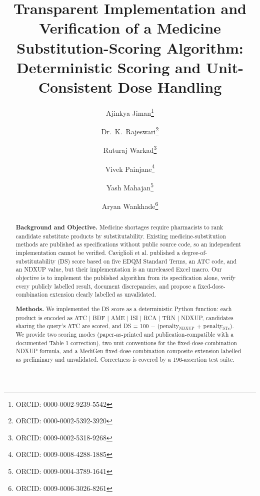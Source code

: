\documentclass[a4paper]{elsarticle}
\begin{document}
\onecolumn

{
\setlength{\parskip}{1pt}
\setlength{\parindent}{0pt}
\begin{frontmatter}

\title{Transparent Implementation and Verification of a Medicine Substitution-Scoring Algorithm:\\Deterministic Scoring and Unit-Consistent Dose Handling}

\author[1]{Ajinkya Jiman\footnote{ORCID: 0000-0002-9239-5542}}
\author[1]{Dr.~K.~Rajeswari\footnote{ORCID: 0000-0002-5392-3920}}
\author[1]{Ruturaj Warkad\footnote{ORCID: 0009-0002-5318-9268}}
\author[1]{Vivek Painjane\footnote{ORCID: 0009-0008-4288-1885}}
\author[1]{Yash Mahajan\footnote{ORCID: 0009-0004-3789-1641}}
\author[1]{Aryan Wankhade\footnote{ORCID: 0009-0006-3026-8261}}



\begin{abstract}
\textbf{Background and Objective.} Medicine shortages require pharmacists to rank candidate substitute products by substitutability. Existing medicine-substitution methods are published as specifications without public source code, so an independent implementation cannot be verified. Caviglioli et al. published a degree-of-substitutability (DS) score based on five EDQM Standard Terms, an ATC code, and an NDXUP value, but their implementation is an unreleased Excel macro. Our objective is to implement the published algorithm from its specification alone, verify every publicly labelled result, document discrepancies, and propose a fixed-dose-combination extension clearly labelled as unvalidated.

\textbf{Methods.} We implemented the DS score as a deterministic Python function: each product is encoded as ATC | BDF | AME | ISI | RCA | TRN | NDXUP, candidates sharing the query's ATC are scored, and DS = 100 $-$ (penalty$_\text{NDXUP}$ + penalty$_\text{STs}$). We provide two scoring modes (paper-as-printed and publication-compatible with a documented Table 1 correction), two unit conventions for the fixed-dose-combination NDXUP formula, and a MediGen fixed-dose-combination composite extension labelled as preliminary and unvalidated. Correctness is covered by a 196-assertion test suite.


\end{abstract}
\end{frontmatter}}
\end{document}
